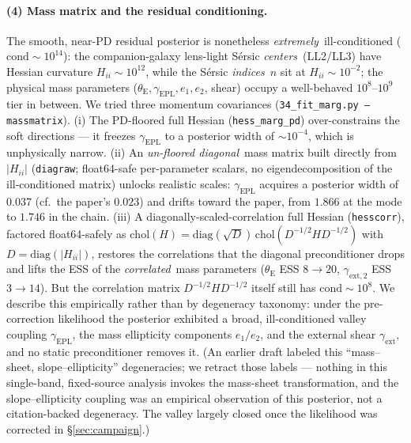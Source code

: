 \documentclass[11pt,letterpaper]{article}
\newcommand{\thetaE}{\ensuremath{\theta_{\mathrm{E}}}}
\newcommand{\gammaEPL}{\ensuremath{\gamma_{\mathrm{EPL}}}}
\newcommand{\gext}{\ensuremath{\gamma_{\mathrm{ext}}}}
\newcommand{\gexttwo}{\ensuremath{\gamma_{\mathrm{ext},2}}}
\newcommand{\eone}{\ensuremath{e_{1}}}
\newcommand{\etwo}{\ensuremath{e_{2}}}
\begin{document}
\paragraph{(4) Mass matrix and the residual conditioning.} The smooth,
near-PD residual posterior is nonetheless {\it extremely}\
ill-conditioned ($\mathrm{cond}\sim10^{14}$): the companion-galaxy
lens-light S\'{e}rsic {\it centers}\ (LL2/LL3) have Hessian curvature
$H_{ii}\sim10^{12}$, while the S\'{e}rsic {\it indices}\ $n$ sit at
$H_{ii}\sim10^{-2}$; the physical mass parameters
($\thetaE,\gammaEPL,e_1,e_2$, shear) occupy a well-behaved
$10^{8}$--$10^{9}$ tier in between. We tried three momentum covariances
(\texttt{34\_fit\_marg.py --massmatrix}). (i) The PD-floored full Hessian
(\texttt{hess\_marg\_pd}) over-constrains the soft directions --- it
freezes $\gammaEPL$ to a posterior width of $\sim 10^{-4}$, which is
unphysically narrow. (ii) An {\it un-floored diagonal}\ mass matrix built
directly from $|H_{ii}|$ (\texttt{diagraw}; float64-safe per-parameter
scalars, no eigendecomposition of the ill-conditioned matrix) unlocks
realistic scales: $\gammaEPL$ acquires a posterior width of $0.037$ (cf.\
the paper's $0.023$) and drifts toward the paper, from $1.866$ at the
mode to $1.746$ in the chain. (iii) A diagonally-scaled-correlation full
Hessian (\texttt{hesscorr}), factored float64-safely as
$\mathrm{chol}(H)=\mathrm{diag}(\sqrt{D})\,\mathrm{chol}(D^{-1/2}HD^{-1/2})$
with $D=\mathrm{diag}(|H_{ii}|)$, restores the correlations that the
diagonal preconditioner drops and lifts the ESS of the {\it correlated}\
mass parameters ($\thetaE$ ESS $8\!\to\!20$, $\gexttwo$ ESS
$3\!\to\!14$). But the correlation matrix $D^{-1/2}HD^{-1/2}$ itself
still has $\mathrm{cond}\sim10^{8}$. We describe this empirically rather
than by degeneracy taxonomy: under the pre-correction likelihood the
posterior exhibited a broad, ill-conditioned valley coupling
$\gammaEPL$, the mass ellipticity components $\eone/\etwo$, and the
external shear $\gext$, and no static preconditioner removes it. (An
earlier draft labeled this ``mass--sheet, slope--ellipticity''
degeneracies; we retract those labels --- nothing in this single-band,
fixed-source analysis invokes the mass-sheet transformation, and the
slope--ellipticity coupling was an empirical observation of this
posterior, not a citation-backed degeneracy. The valley largely closed
once the likelihood was corrected in \S\ref{sec:campaign}.)
\end{document}
